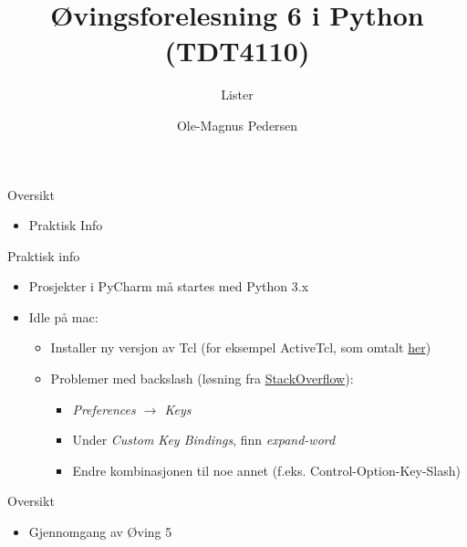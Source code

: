 \documentclass[screen, aspectratio=169]{beamer}
\title[Short title]{Øvingsforelesning 6 i Python (TDT4110)}
\subtitle{Lister}
\author[O.M. Pedersen]{Ole-Magnus Pedersen}
\institute[NTNU]{}
\date{}
\begin{document}
\begin{frame}
  \titlepage
\end{frame}


\begin{frame}{Oversikt}
	\begin{itemize}
		\item Praktisk Info
	\end{itemize}
\end{frame}

\begin{frame}{Praktisk info}
	\begin{itemize}
		\item Prosjekter i PyCharm må startes med Python 3.x
		\item Idle på mac:
		\begin{itemize}
			\item Installer ny versjon av Tcl (for eksempel ActiveTcl, som omtalt \href{https://www.python.org/download/mac/tcltk/}{her})
			\item Problemer med backslash (løsning fra \href{https://stackoverflow.com/questions/4798930/how-do-i-make-backslash-work-in-idle}{StackOverflow}):
			\begin{itemize}
				\item \emph{Preferences $\rightarrow$ Keys}
				\item Under \emph{Custom Key Bindings}, finn \emph{expand-word}
				\item Endre kombinasjonen til noe annet (f.eks. Control-Option-Key-Slash)
			\end{itemize}
		\end{itemize}
	\end{itemize}
\end{frame}

\begin{frame}{Oversikt}
	\begin{itemize}
		\item Gjennomgang av Øving 5
	\end{itemize}
\end{frame}
\end{document}
